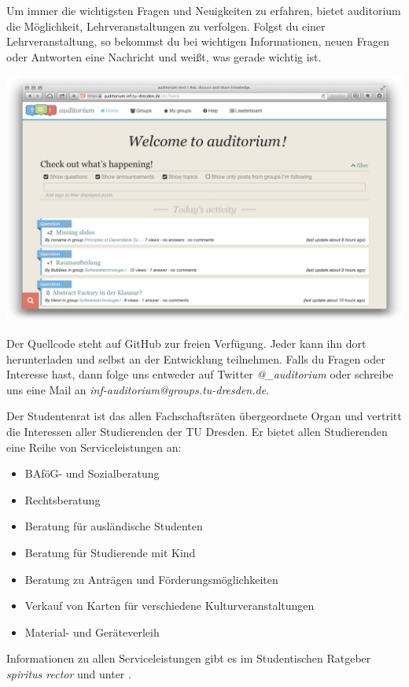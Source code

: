 Um immer die wichtigsten Fragen und Neuigkeiten zu erfahren, bietet auditorium die Möglichkeit, Lehrveranstaltungen zu verfolgen.
Folgst du einer Lehrveranstaltung, so bekommst du bei wichtigen Informationen, neuen Fragen oder Antworten eine Nachricht und weißt, was gerade wichtig ist.

{
\centering
\includegraphics[width=.75\linewidth]{img/auditorium.png}
\par
}

Der Quellcode steht auf GitHub  zur freien Verfügung.
Jeder kann ihn dort herunterladen und selbst an der Entwicklung teilnehmen.
Falls du Fragen oder Interesse hast, dann folge uns entweder auf Twitter \textit{@\_auditorium} oder schreibe uns eine Mail an \textit{inf-auditorium@groups.tu-dresden.de}.

\newpage

Der Studentenrat ist das allen Fachschaftsräten übergeordnete Organ und vertritt die Interessen aller Studierenden der TU Dresden. Er bietet allen Studierenden eine Reihe von Serviceleistungen an:
\begin{itemize}
\item BAföG- und Sozialberatung
\item Rechtsberatung
\item Beratung für ausländische Studenten
\item Beratung für Studierende mit Kind
\item Beratung zu Anträgen und Förderungsmöglichkeiten
\item Verkauf von Karten für verschiedene Kulturveranstaltungen
\item Material- und Geräteverleih
\end{itemize}

Informationen zu allen Serviceleistungen gibt es im Studentischen Ratgeber \textit{spiritus rector}  und unter .

